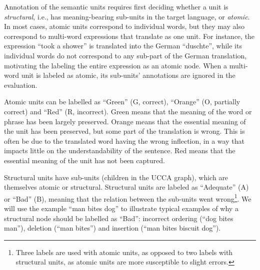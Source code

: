 \documentclass[11pt,letterpaper]{article}
\newcommand{\XXX}[1]{{\color{red}XXX #1}} %
\begin{document}
Annotation of the semantic units requires first deciding whether
a unit is {\it structural}, i.e., has meaning-bearing
sub-units in the target language, or {\it atomic}.
In most cases, atomic units
correspond to individual words, but they may also correspond to
multi-word expressions that translate as one unit. For instance,
the expression ``took a shower'' is translated into the German ``duschte'',
while its individual words do not correspond to any sub-part of the German translation,
motivating the labeling the entire expression as an atomic node.
When a multi-word unit is labeled as atomic, its sub-units' annotations are ignored
in the evaluation.

Atomic units can be labelled as ``Green'' (G, correct), ``Orange'' (O, partially correct)
and ``Red'' (R, incorrect). 
Green means that the meaning of the word or phrase has been largely preserved.
Orange means that the essential meaning of the unit has been preserved,
but some part of the translation is wrong.
This is often be due to the translated word having the wrong inflection,
in a way that impacts little on the understandability of the sentence.
Red means that the essential meaning of the unit has not been captured.

Structural units have sub-units (children in the UCCA graph),
which are themselves atomic or structural.
Structural units are labeled as ``Adequate'' (A) or ``Bad'' (B), meaning
that the relation between the sub-units went wrong\footnote{
  Three labels are used with atomic units, as opposed to two labels with structural units,
as atomic units are more susceptible to slight errors.}.
We will use the example ``man bites dog'' to illustrate typical examples of why a structural node
should be labelled as ``Bad'':
incorrect ordering (``dog bites man''), 
deletion (``man bites'') and insertion (``man bites biscuit dog''). 
\end{document}
